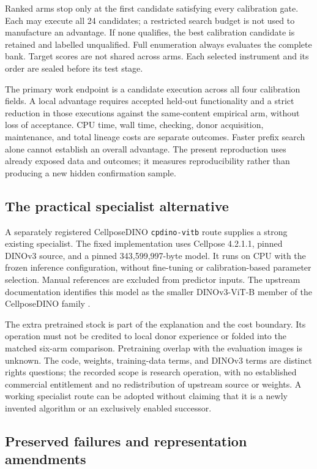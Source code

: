 Ranked arms stop only at the first candidate satisfying every calibration gate. Each may execute all 24 candidates; a restricted search budget is not used to manufacture an advantage. If none qualifies, the best calibration candidate is retained and labelled unqualified. Full enumeration always evaluates the complete bank. Target scores are not shared across arms. Each selected instrument and its order are sealed before its test stage.

The primary work endpoint is a candidate execution across all four calibration fields. A local advantage requires accepted held-out functionality and a strict reduction in those executions against the same-content empirical arm, without loss of acceptance. CPU time, wall time, checking, donor acquisition, maintenance, and total lineage costs are separate outcomes. Faster prefix search alone cannot establish an overall advantage. The present reproduction uses already exposed data and outcomes; it measures reproducibility rather than producing a new hidden confirmation sample.

\subsection{The practical specialist alternative}

A separately registered CellposeDINO \texttt{cpdino-vitb} route supplies a strong existing specialist. The fixed implementation uses Cellpose 4.2.1.1, pinned DINOv3 source, and a pinned 343,599,997-byte model. It runs on CPU with the frozen inference configuration, without fine-tuning or calibration-based parameter selection. Manual references are excluded from predictor inputs. The upstream documentation identifies this model as the smaller DINOv3-ViT-B member of the CellposeDINO family \citep{cellposeModels}.

The extra pretrained stock is part of the explanation and the cost boundary. Its operation must not be credited to local donor experience or folded into the matched six-arm comparison. Pretraining overlap with the evaluation images is unknown. The code, weights, training-data terms, and DINOv3 terms are distinct rights questions; the recorded scope is research operation, with no established commercial entitlement and no redistribution of upstream source or weights. A working specialist route can be adopted without claiming that it is a newly invented algorithm or an exclusively enabled successor.

\subsection{Preserved failures and representation amendments}

